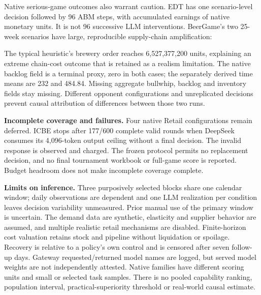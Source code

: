 \documentclass[11pt,a4paper]{article}
\begin{document}
Native serious-game outcomes also warrant caution. EDT has one scenario-level decision followed by 96 ABM steps, with accumulated earnings of \EDTEarnings{} native monetary units. It is not 96 successive LLM interventions. BeerGame's two 25-week scenarios have large, reproducible supply-chain amplification:
\begin{center}\footnotesize
{}\label{tab:beer}\end{center}
The typical heuristic's brewery order reaches 6,527,377,200 units, explaining an extreme chain-cost outcome that is retained as a realism limitation. The native backlog field is a terminal proxy, zero in both cases; the separately derived time means are 232 and 484.84. Missing aggregate bullwhip, backlog and inventory fields stay missing. Different opponent configurations and unreplicated decisions prevent causal attribution of differences between those two runs.

\textbf{Incomplete coverage and failures.} Four native Retail configurations remain deferred. ICBE stops after 177/600 complete valid rounds when DeepSeek consumes its 4,096-token output ceiling without a final decision. The invalid response is observed and charged. The frozen protocol permits no replacement decision, and no final tournament workbook or full-game score is reported. Budget headroom does not make incomplete coverage complete.

\textbf{Limits on inference.} Three purposively selected blocks share one calendar window; daily observations are dependent and one LLM realization per condition leaves decision variability unmeasured. Prior manual use of the primary window is uncertain. The demand data are synthetic, elasticity and supplier behavior are assumed, and multiple realistic retail mechanisms are disabled. Finite-horizon cost valuation retains stock and pipeline without liquidation or spoilage. Recovery is relative to a policy's own control and is censored after seven follow-up days. Gateway requested/returned model names are logged, but served model weights are not independently attested. Native families have different scoring units and small or selected task samples. There is no pooled capability ranking, population interval, practical-superiority threshold or real-world causal estimate.
\end{document}
